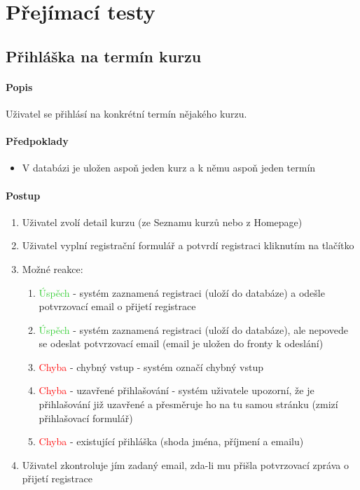 \documentclass[12pt,a4paper,titlepage,final]{report}
\begin{document}
		
		


	
\section{Přejímací testy}


\subsection{Přihláška na termín kurzu}

\paragraph{Popis}

Uživatel se přihlásí na konkrétní termín nějakého kurzu.

\paragraph{Předpoklady}

\begin{itemize}
	\item V databázi je uložen aspoň jeden kurz a k němu aspoň jeden termín
\end{itemize}

\paragraph{Postup}
\begin{enumerate}
	\item Uživatel zvolí detail kurzu (ze Seznamu kurzů nebo z Homepage)
	\item Uživatel vyplní registrační formulář a potvrdí registraci kliknutím na tlačítko
	\item Možné reakce:
	\begin{enumerate}
		\item \textcolor{LimeGreen}{Úspěch} - systém zaznamená registraci (uloží do databáze) a odešle potvrzovací email o přijetí registrace
		\item \textcolor{LimeGreen}{Úspěch} - systém zaznamená registraci (uloží do databáze), ale nepovede se odeslat potvrzovací email (email je uložen do fronty k odeslání)
		\item \textcolor{Red}{Chyba} - chybný vstup - systém označí chybný vstup
		\item \textcolor{Red}{Chyba} - uzavřené přihlašování - systém uživatele upozorní, že je přihlašování již uzavřené a přesměruje ho na tu samou stránku (zmizí přihlašovací formulář)
		\item \textcolor{Red}{Chyba} - existující přihláška (shoda jména, příjmení a emailu)
	\end{enumerate}
	\item Uživatel zkontroluje jím zadaný email, zda-li mu přišla potvrzovací zpráva o přijetí registrace
\end{enumerate}
\end{document}
